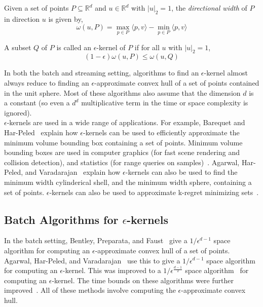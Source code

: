 \begin{definition}
Given a set of points $P \subseteq \mathbb{R}^d$ and $u \in \mathbb{R}^d$ with $|u|_2 = 1$, the \emph{directional width} of $P$ in direction $u$ is given by,
\[ \omega(u, P) = \max_{p \in P}\langle p, v \rangle - \min_{p \in P}\langle p, v \rangle \] 
\end{definition}

\begin{definition}
A subset $Q$ of $P$ is called an $\epsilon$-kernel of $P$ if for all $u$ with $|u|_2 = 1$,
\[ (1 - \epsilon) \omega(u, P) \leq \omega(u, Q) \]
\end{definition}

In both the batch and streaming setting, algorithms to find an $\epsilon$-kernel almost always reduce to finding an $\epsilon$-approximate convex hull of a set of points contained in the unit sphere. Most of these algorithms also assume that the dimension $d$ is a constant (so even a $d^d$ multiplicative term in the time or space complexity is ignored).
\\

$\epsilon$-kernels are used in a wide range of applications. For example, Barequet and Har-Peled~\cite{BAREQUET200191} explain how $\epsilon$-kernels can be used to efficiently approximate the minimum volume bounding box containing a set of points. Minimum volume bounding boxes are used in computer graphics (for fast scene rendering and collision detection), and statistics (for range queries on samples)~\cite{BAREQUET200191}. Agarwal, Har-Peled, and Varadarajan~\cite{Agarwal:2004:AEM:1008731.1008736} explain how $\epsilon$-kernels can also be used to find the minimum width cylinderical shell, and the minimum width sphere, containing a set of points. $\epsilon$-kernels can also be used to approximate k-regret minimizing sets~\cite{DBLP:journals/corr/AgarwalKSS17}.

\subsection{Batch Algorithms for $\epsilon$-kernels}

In the batch setting, Bentley, Preparata, and Faust~\cite{Bentley:1982:AAC:358315.358392} give a $1/\epsilon^{d-1}$ space algorithm for computing an $\epsilon$-approximate convex hull of a set of points. Agarwal, Har-Peled, and Varadarajan~\cite{Agarwal:2004:AEM:1008731.1008736} use this to give a $1/\epsilon^{d-1}$ space algorithm for computing an $\epsilon$-kernel. This was improved to a $1/\epsilon^{\frac{d-1}{2}}$ space algorithm~\cite{Yu:2004:PMS:997817.997858, CHAN200620} for computing an $\epsilon$-kernel. The time bounds on these algorithms were further improved~\cite{timchansocg2017, aryasocg2017}. All of these methods involve computing the $\epsilon$-approximate convex hull.
\\

